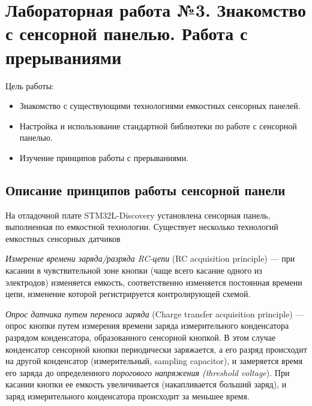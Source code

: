 \chapter{Лабораторная работа №3. Знакомство с сенсорной панелью. Работа с прерываниями}

Цель работы: 
\begin{itemize}
\item Знакомство с существующими технологиями емкостных сенсорных панелей.
\item Настройка и использование стандартной библиотеки по работе с сенсорной панелью.
\item Изучение принципов работы с прерываниями.
\end{itemize}

\section{Описание принципов работы сенсорной панели}
На отладочной плате STM32L-Discovery установлена сенсорная панель, выполненная по емкостной технологии. Существует несколько технологий емкостных сенсорных датчиков \cite{appnote}

\textit{Измерение времени заряда/разряда RC-цепи} (RC acquisition principle) --- при касании в чувствительной зоне кнопки (чаще всего касание одного из электродов) изменяется емкость, соответственно изменяется постоянная времени цепи, изменение которой регистрируется контролирующей схемой. 
	
	\textit{Опрос датчика путем переноса заряда} (Charge transfer acquisition principle) --- опрос кнопки путем измерения времени заряда измерительного конденсатора разрядом конденсатора, образованного сенсорной кнопкой. В этом случае конденсатор сенсорной кнопки периодически заряжается, а его разряд происходит на другой конденсатор (измерительный, sampling capacitor), и замеряется время его заряда до определенного \textit{порогового напряжения (threshold voltage}). При касании кнопки ее емкость увеличивается (накапливается больший заряд), и заряд измерительного конденсатора происходит за меньшее время.   
	
